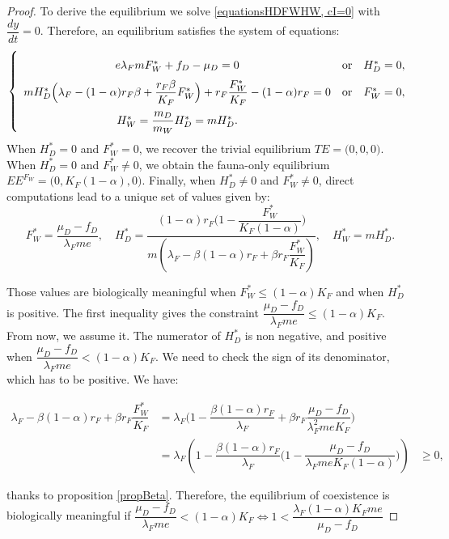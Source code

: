 \documentclass{article}
\newcommand{\lfw}{\lambda_{F}}
\newcommand{\lfw}{\lambda_{F}}
\begin{document}
\begin{proof}
To derive the equilibrium we solve \eqref{equationsHDFWHW, cI=0} with $\dfrac{d y}{dt} = 0$. Therefore, an equilibrium satisfies the system of equations:
\begin{equation}\label{system-equilibre, cI=0}
\def\arraystretch{2}
\left\lbrace \begin{array}{cll}
 e \lfw m F_W^* + f_D - \mu_D = 0& \mbox{or} & H_D^* = 0,\\
m H_D^*\Big(\lfw - (1-\alpha)r_F \beta + \dfrac{r_F \beta}{K_F}F_W^* \Big) + r_F \dfrac{F_W^*}{K_F} - (1-\alpha)r_F= 0& \mbox{or} & F^*_W = 0,\\
H_W^* = \dfrac{m_D}{m_W} H_D^* = m H_D^*.&&
\end{array} \right.
\end{equation}
When $H_D^*=0$ and $F_W^*=0$, we recover the trivial equilibrium $TE = \Big(0,0,0\Big)$. When $H_D^*=0$ and $F_W^*\neq0$, we obtain the fauna-only equilibrium $EE^{F_W} = \Big(0, K_F(1-\alpha), 0 \Big)$. Finally, when $H_D^*\neq0$ and $F_W^*\neq0$, direct computations lead to a unique set of values given by:
$$F^*_{W} = \dfrac{\mu_D - f_D}{\lfw m e},
\quad 
H^*_{D} = \dfrac{(1-\alpha)r_F\Big(1 - \dfrac{F^*_{W}}{K_F(1-\alpha)} \Big)}{m\left(\lfw - \beta (1-\alpha) r_F + \beta r_F  \dfrac{F^*_{W}}{K_F}\right)} ,
\quad 
H^*_{W} = m H^*_{D}.$$

Those values are biologically meaningful when $F_W^* \leq (1-\alpha) K_F$ and when $H_D^*$ is positive. The first inequality gives the constraint $\dfrac{\mu_D - f_D}{\lfw m e} \leq (1-\alpha)K_F$. From now, we assume it. The numerator of $H^*_{D}$ is non negative, and positive when $\dfrac{\mu_D - f_D}{\lfw m e} < (1-\alpha)K_F$. We need to check the sign of its denominator, which has to be positive. We have:

\begin{align*}
\lfw - \beta (1-\alpha) r_F + \beta r_F  \dfrac{F^*_{W}}{K_F} &= \lfw\Big(1 - \dfrac{\beta (1-\alpha) r_F}{\lfw} + \beta r_F  \dfrac{\mu_D - f_D}{\lfw^2 m e K_F} \Big) \\
&= \lfw\left(1 - \dfrac{\beta (1-\alpha) r_F}{\lfw}\Big(1 -\dfrac{\mu_D - f_D}{\lfw m e K_F(1-\alpha)} \Big) \right)
&\geq 0,
\end{align*}

thanks to proposition \ref{propBeta}. Therefore, the equilibrium of coexistence is biologically meaningful if $\dfrac{\mu_D - f_D}{\lfw m e} < (1-\alpha)K_F \Leftrightarrow 1 < \dfrac{\lfw (1-\alpha)K_F m e}{\mu_D - f_D}$

\end{proof}
\end{document}
